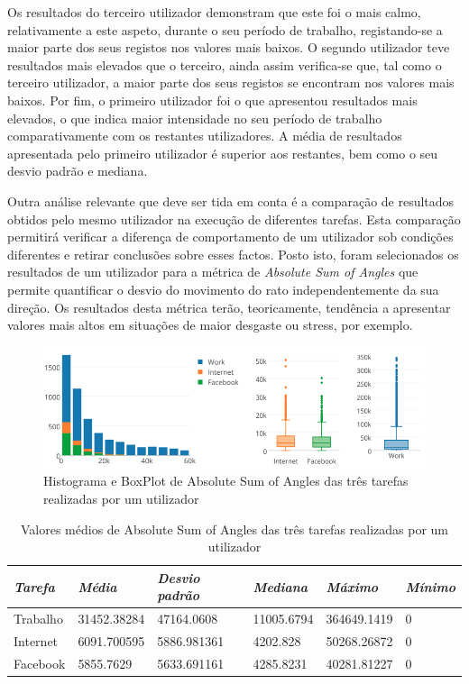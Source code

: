 Os resultados do terceiro utilizador demonstram que este foi o mais calmo, relativamente a este aspeto, durante o seu período de trabalho, registando-se a maior parte dos seus registos nos valores mais baixos. O segundo utilizador teve resultados mais elevados que o terceiro, ainda assim verifica-se que, tal como o terceiro utilizador, a maior parte dos seus registos se encontram nos valores mais baixos. Por fim, o primeiro utilizador foi o que apresentou resultados mais elevados, o que indica maior intensidade no seu período de trabalho comparativamente com os restantes utilizadores. A média de resultados apresentada pelo primeiro utilizador é superior aos restantes, bem como o seu desvio padrão e mediana. 

Outra análise relevante que deve ser tida em conta é a comparação de resultados obtidos pelo mesmo utilizador na execução de diferentes tarefas. Esta comparação permitirá verificar a diferença de comportamento de um utilizador sob condições diferentes e retirar conclusões sobre esses factos. Posto isto, foram selecionados os resultados de um utilizador para a métrica de \textit{Absolute Sum of Angles} que permite quantificar o desvio do movimento do rato independentemente da sua direção. Os resultados desta métrica terão, teoricamente, tendência a apresentar valores mais altos em situações de maior desgaste ou stress, por exemplo.


 \begin{figure}[htb]
   \centering
   \includegraphics[scale=0.45]{Images/absolutesumofangles.png}
   \caption{Histograma e BoxPlot de Absolute Sum of Angles das três tarefas realizadas por um utilizador}
\end{figure}

{\renewcommand{\arraystretch}{1.0}
\begin{table}[!htb]
\centering
\label{tab:a_tbk}
\vspace{2pt}
\begin{tabular}{ | l | l | l | l | l | l |  }
\hline
\textit{Tarefa}&\textit{Média}&\textit{Desvio padrão}&\textit{Mediana} & \textit{Máximo} & \textit{Mínimo}\\  
\hline
Trabalho&31452.38284&47164.0608&11005.6794&364649.1419&0 \\
Internet&6091.700595&5886.981361&4202.828&50268.26872&0 \\
Facebook&5855.7629&5633.691161&4285.8231&40281.81227&0 \\
\hline
\end{tabular}
\caption{Valores médios de Absolute Sum of Angles das três tarefas realizadas por um utilizador} 
\end{table}}

